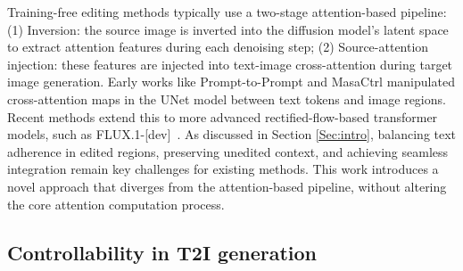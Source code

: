 \documentclass{article}
\begin{document}



Training-free editing methods typically use a two-stage attention-based pipeline: (1) Inversion: the source image is inverted into the diffusion model's latent space to extract attention features during each denoising step; (2) Source-attention injection: these features are injected into text-image cross-attention during target image generation. Early works like Prompt-to-Prompt \citep{hertz2022prompt} and MasaCtrl \citep{cao2023masactrl} manipulated cross-attention maps in the UNet model between text tokens and image regions. Recent methods \citep{rout2024semantic,wang2024taming,deng2024fireflow,tewel2025addit,zhu2025kv} extend this to more advanced rectified-flow-based transformer models, such as FLUX.1-[dev]~\citep{blackforest2024FLUX}. As discussed in Section \ref{Sec:intro}, balancing text adherence in edited regions, preserving unedited context, and achieving seamless integration remain key challenges for existing methods. This work introduces a novel approach that diverges from the attention-based pipeline, without altering the core attention computation process.




\vspace{-2mm}

\subsection{Controllability in T2I generation}
\end{document}
